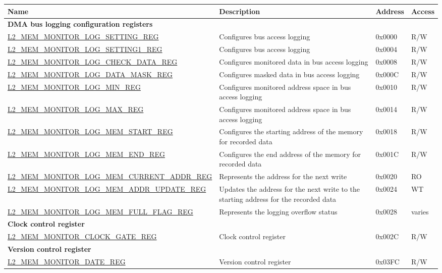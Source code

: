 \begin{longtable}{ | p{8.7cm} | m{5.3cm} | p{1.2cm} | p{1.2cm} | }
\hline\rowcolor{lightgray}
{\bfseries Name} & {\bfseries Description} &  {\bfseries Address} & {\bfseries Access} \\ \hline
\endhead
\multicolumn{4}{|l|}{\textbf{DMA bus logging configuration registers}} \\ \hline
\hyperref[regdesc:L2MEMMONITORLOGSETTINGREG]{L2\_MEM\_MONITOR\_LOG\_SETTING\_REG} & Configures bus access logging & 0x0000 & R/W \\ \hline
\hyperref[regdesc:L2MEMMONITORLOGSETTING1REG]{L2\_MEM\_MONITOR\_LOG\_SETTING1\_REG} & Configures bus access logging & 0x0004 & R/W \\ \hline
\hyperref[regdesc:L2MEMMONITORLOGCHECKDATAREG]{L2\_MEM\_MONITOR\_LOG\_CHECK\_DATA\_REG} & Configures monitored data in bus access logging & 0x0008 & R/W \\ \hline
\hyperref[regdesc:L2MEMMONITORLOGDATAMASKREG]{L2\_MEM\_MONITOR\_LOG\_DATA\_MASK\_REG} & Configures masked data in bus access logging & 0x000C & R/W \\ \hline
\hyperref[regdesc:L2MEMMONITORLOGMINREG]{L2\_MEM\_MONITOR\_LOG\_MIN\_REG} & Configures monitored address space in bus access logging & 0x0010 & R/W \\ \hline
\hyperref[regdesc:L2MEMMONITORLOGMAXREG]{L2\_MEM\_MONITOR\_LOG\_MAX\_REG} & Configures monitored address space in bus access logging & 0x0014 & R/W \\ \hline
\hyperref[regdesc:L2MEMMONITORLOGMEMSTARTREG]{L2\_MEM\_MONITOR\_LOG\_MEM\_START\_REG} & Configures the starting address of the memory for recorded data & 0x0018 & R/W \\ \hline
\hyperref[regdesc:L2MEMMONITORLOGMEMENDREG]{L2\_MEM\_MONITOR\_LOG\_MEM\_END\_REG} & Configures the end address of the memory for recorded data & 0x001C & R/W \\ \hline
\hyperref[regdesc:L2MEMMONITORLOGMEMCURRENTADDRREG]{L2\_MEM\_MONITOR\_LOG\_MEM\_CURRENT\_ADDR\_REG} & Represents the address for the next write & 0x0020 & RO \\ \hline
\hyperref[regdesc:L2MEMMONITORLOGMEMADDRUPDATEREG]{L2\_MEM\_MONITOR\_LOG\_MEM\_ADDR\_UPDATE\_REG} & Updates the address for the next write to the starting address for the recorded data & 0x0024 & WT \\ \hline
\hyperref[regdesc:L2MEMMONITORLOGMEMFULLFLAGREG]{L2\_MEM\_MONITOR\_LOG\_MEM\_FULL\_FLAG\_REG} & Represents the logging overflow status  & 0x0028 & varies \\ \hline
\multicolumn{4}{|l|}{\textbf{Clock control register}} \\ \hline
\hyperref[regdesc:L2MEMMONITORCLOCKGATEREG]{L2\_MEM\_MONITOR\_CLOCK\_GATE\_REG} & Clock control register  & 0x002C & R/W \\ \hline
\multicolumn{4}{|l|}{\textbf{Version control register}} \\ \hline
\hyperref[regdesc:L2MEMMONITORDATEREG]{L2\_MEM\_MONITOR\_DATE\_REG} & Version control register & 0x03FC & R/W \\ \hline
\end{longtable}
